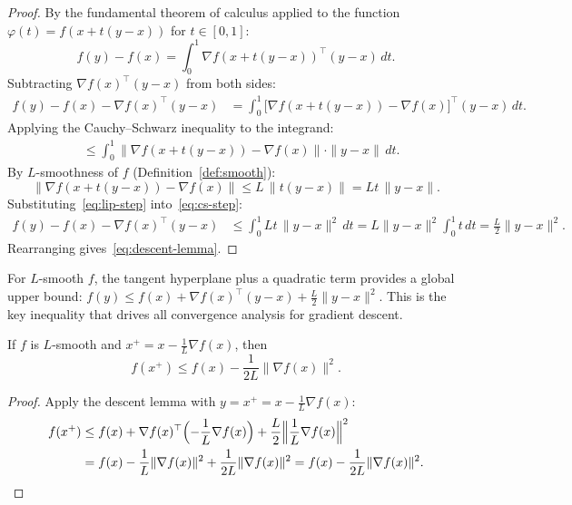 \documentclass[11pt,a4paper]{article}
\begin{document}
\begin{proof}
By the fundamental theorem of calculus applied to the function
$\varphi(t) = f(x + t(y - x))$ for $t \in [0, 1]$:
\begin{equation}\label{eq:ftc}
  f(y) - f(x) = \int_0^1 \nabla f(x + t(y-x))^\top(y - x)\, dt.
\end{equation}
Subtracting $\nabla f(x)^\top(y - x)$ from both sides:
\begin{align}
  f(y) - f(x) - \nabla f(x)^\top(y-x)
  &= \int_0^1 \bigl[\nabla f(x + t(y-x)) - \nabla f(x)\bigr]^\top
     (y - x)\, dt. \label{eq:ftc-centered}
\end{align}
Applying the Cauchy--Schwarz inequality to the integrand:
\begin{align}
  &\le \int_0^1 \|\nabla f(x + t(y-x)) - \nabla f(x)\| \cdot
       \|y - x\|\, dt. \label{eq:cs-step}
\end{align}
By $L$-smoothness of $f$ (Definition~\ref{def:smooth}):
\begin{equation}\label{eq:lip-step}
  \|\nabla f(x + t(y-x)) - \nabla f(x)\| \le L\, \|t(y-x)\|
  = Lt\, \|y - x\|.
\end{equation}
Substituting~\eqref{eq:lip-step} into~\eqref{eq:cs-step}:
\begin{align}
  f(y) - f(x) - \nabla f(x)^\top(y-x)
  &\le \int_0^1 Lt\, \|y - x\|^2\, dt
  = L\|y - x\|^2 \int_0^1 t\, dt
  = \frac{L}{2}\|y - x\|^2. \label{eq:descent-final}
\end{align}
Rearranging gives~\eqref{eq:descent-lemma}.
\end{proof}

\begin{keyresult}[title={Descent Lemma}]
For $L$-smooth $f$, the tangent hyperplane plus a quadratic term provides
a global upper bound:
$f(y) \le f(x) + \nabla f(x)^\top(y-x) + \frac{L}{2}\|y-x\|^2$.
This is the key inequality that drives all convergence analysis for
gradient descent.
\end{keyresult}

\begin{corollary}\label{cor:sufficient-decrease}
If $f$ is $L$-smooth and $x^+ = x - \frac{1}{L}\nabla f(x)$, then
\begin{equation}\label{eq:suff-decrease}
  f(x^+) \le f(x) - \frac{1}{2L}\|\nabla f(x)\|^2.
\end{equation}
\end{corollary}

\begin{proof}
Apply the descent lemma with $y = x^+ = x - \frac{1}{L}\nabla f(x)$:
\begin{align*}
  f(x^+) &\le f(x) + \nabla f(x)^\top\Bigl(-\frac{1}{L}\nabla f(x)\Bigr)
    + \frac{L}{2}\Bigl\|\frac{1}{L}\nabla f(x)\Bigr\|^2 \\
  &= f(x) - \frac{1}{L}\|\nabla f(x)\|^2
    + \frac{1}{2L}\|\nabla f(x)\|^2
  = f(x) - \frac{1}{2L}\|\nabla f(x)\|^2. \qedhere
\end{align*}
\end{proof}
\end{document}
